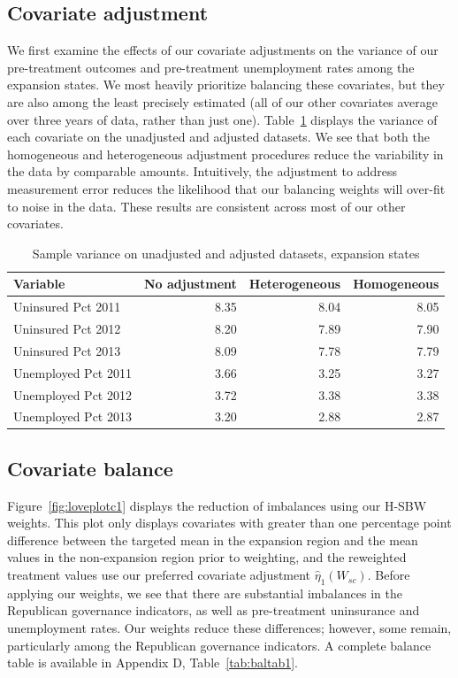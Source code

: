 \documentclass[article]{imsart}
\theoremstyle{plain}
\theoremstyle{remark}
\begin{document}
\subsection{Covariate adjustment}

We first examine the effects of our covariate adjustments on the variance of our pre-treatment outcomes and pre-treatment unemployment rates among the expansion states. We most heavily prioritize balancing these covariates, but they are also among the least precisely estimated (all of our other covariates average over three years of data, rather than just one). Table~\ref{tab:adjust1} displays the variance of each covariate on the unadjusted and adjusted datasets. We see that both the homogeneous and heterogeneous adjustment procedures reduce the variability in the data by comparable amounts. Intuitively, the adjustment to address measurement error reduces the likelihood that our balancing weights will over-fit to noise in the data. These results are consistent across most of our other covariates.

\begin{table}[ht]
\caption{Sample variance on unadjusted and adjusted datasets, expansion states}
\label{tab:adjust1}
\begin{tabular}{lrrr}
  \hline
Variable & No adjustment & Heterogeneous & Homogeneous \\ 
  \hline
Uninsured Pct 2011 & 8.35 & 8.04 & 8.05 \\ 
  Uninsured Pct 2012 & 8.20 & 7.89 & 7.90 \\ 
  Uninsured Pct 2013 & 8.09 & 7.78 & 7.79 \\ 
  Unemployed Pct 2011 & 3.66 & 3.25 & 3.27 \\ 
  Unemployed Pct 2012 & 3.72 & 3.38 & 3.38 \\ 
  Unemployed Pct 2013 & 3.20 & 2.88 & 2.87 \\ 
   \hline
\end{tabular}
\end{table}

\subsection{Covariate balance}

Figure~\ref{fig:loveplotc1} displays the reduction of imbalances using our H-SBW weights. This plot only displays covariates with greater than one percentage point difference between the targeted mean in the expansion region and the mean values in the non-expansion region prior to weighting, and the reweighted treatment values use our preferred covariate adjustment $\hat{\eta}_1(W_{sc})$. Before applying our weights, we see that there are substantial imbalances in the Republican governance indicators, as well as pre-treatment uninsurance and unemployment rates. Our weights reduce these differences; however, some remain, particularly among the Republican governance indicators. A complete balance table is available in Appendix D, Table~\ref{tab:baltab1}. 
\end{document}
